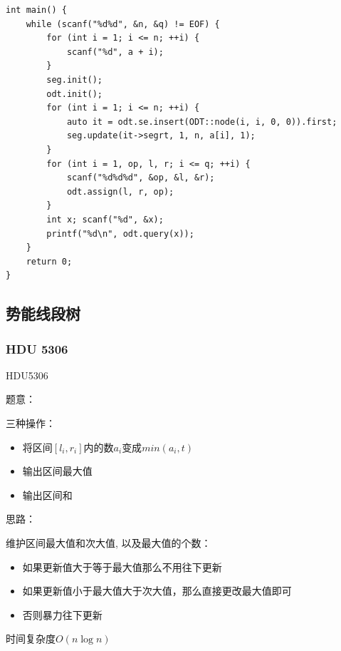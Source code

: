 \begin{lstlisting}
int main() {
	while (scanf("%d%d", &n, &q) != EOF) {
		for (int i = 1; i <= n; ++i) {
			scanf("%d", a + i);
		}
		seg.init();
		odt.init();
		for (int i = 1; i <= n; ++i) { 
			auto it = odt.se.insert(ODT::node(i, i, 0, 0)).first;
			seg.update(it->segrt, 1, n, a[i], 1);
		}
		for (int i = 1, op, l, r; i <= q; ++i) {
			scanf("%d%d%d", &op, &l, &r);
			odt.assign(l, r, op);
		}
		int x; scanf("%d", &x);
		printf("%d\n", odt.query(x));
	}
	return 0;
}
\end{lstlisting}

\subsection{势能线段树}

\subsubsection{HDU 5306}
HDU5306\par
题意：\par
三种操作：\par
\begin{itemize}
\item 将区间$[l_i, r_i]$内的数$a_i$变成$min(a_i, t)$\par
\item 输出区间最大值
\item 输出区间和
\end{itemize}

思路：\par
维护区间最大值和次大值, 以及最大值的个数：
\begin{itemize}
\item 如果更新值大于等于最大值那么不用往下更新
\item 如果更新值小于最大值大于次大值，那么直接更改最大值即可
\item 否则暴力往下更新
\end{itemize}
时间复杂度$O(n\log n)$

